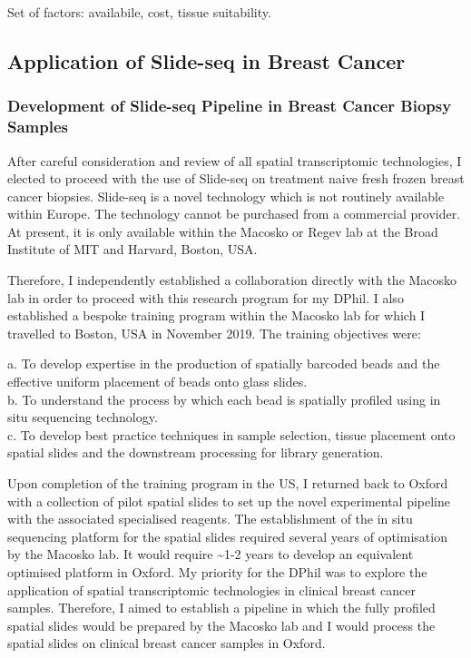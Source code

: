 Set of factors: availabile, cost, tissue suitability.

\subsection{Application of Slide-seq in Breast Cancer}
\subsubsection{Development of Slide-seq Pipeline in Breast Cancer Biopsy Samples}

After careful consideration and review of all spatial transcriptomic technologies, I elected to proceed with the use of Slide-seq on treatment naive fresh frozen breast cancer biopsies. Slide-seq is a novel technology which is not routinely available within Europe. The technology cannot be purchased from a commercial provider. At present, it is only available within the Macosko or Regev lab at the Broad Institute of MIT and Harvard, Boston, USA.


Therefore, I independently established a collaboration directly with the Macosko lab in order to proceed with this research program for my DPhil. I also established a bespoke training program within the Macosko lab for which I travelled to Boston, USA in November 2019. The training objectives were:

a. To develop expertise in the production of spatially barcoded beads and the effective uniform placement of beads onto glass slides. \\
b. To understand the process by which each bead is spatially profiled using in situ sequencing technology. \\
c. To develop best practice techniques in sample selection, tissue placement onto spatial slides and the downstream processing for library generation.

Upon completion of the training program in the US, I returned back to Oxford with a collection of pilot spatial slides to set up the novel experimental pipeline with the associated specialised reagents. The establishment of the in situ sequencing platform for the spatial slides required several years of optimisation by the Macosko lab. It would require \textasciitilde 1-2 years to develop an equivalent optimised platform in Oxford. My priority for the DPhil was to explore the application of spatial transcriptomic technologies in clinical breast cancer samples. Therefore, I aimed to establish a pipeline in which the fully profiled spatial slides would be prepared by the Macosko lab and I would process the spatial slides on clinical breast cancer samples in Oxford.

